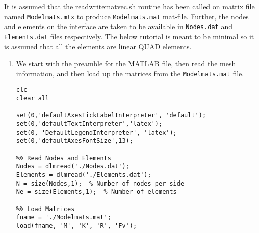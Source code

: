 \documentclass[11pt]{article}
\begin{document}
It is assumed that the \href{https://github.com/Nidish96/Abaqus4Joints/blob/main/scripts/readwritematvec.sh}{readwritematvec.sh} routine has been called on matrix file named \texttt{Modelmats.mtx} to produce \texttt{Modelmats.mat} mat-file.
Further, the nodes and elements on the interface are taken to be available in \texttt{Nodes.dat} and \texttt{Elements.dat} files respectively.
The below tutorial is meant to be minimal so it is assumed that all the elements are linear QUAD elements.
\begin{enumerate}
\item We start with the preamble for the MATLAB file, then read the mesh information, and then load up the matrices from the \texttt{Modelmats.mat} file.
\begin{verbatim}
clc
clear all

set(0,'defaultAxesTickLabelInterpreter', 'default');
set(0,'defaultTextInterpreter','latex');
set(0, 'DefaultLegendInterpreter', 'latex');
set(0,'defaultAxesFontSize',13);

%% Read Nodes and Elements
Nodes = dlmread('./Nodes.dat');
Elements = dlmread('./Elements.dat');
N = size(Nodes,1);  % Number of nodes per side
Ne = size(Elements,1);  % Number of elements

%% Load Matrices
fname = './Modelmats.mat';
load(fname, 'M', 'K', 'R', 'Fv');


\end{verbatim}
\end{enumerate}
\end{document}
